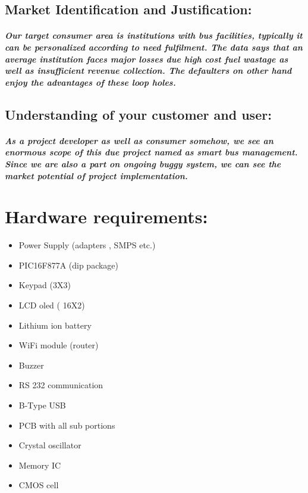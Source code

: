 \documentclass[]{article}
\begin{document}
\subsection{Market Identification and Justification:}
\subparagraph{Our target consumer area is institutions with bus facilities, typically it can be personalized according to need fulfilment. The data says that an average institution faces major losses due high cost fuel wastage as well as insufficient revenue collection. The defaulters on other hand enjoy the advantages of these loop holes.
}

\subsection{Understanding of your customer and user:}
\subparagraph{As a project developer as well as consumer somehow, we see an enormous scope of this due project named as smart bus management. Since we are also a part on ongoing buggy system, we can see the market potential of project implementation.}

\section{Hardware requirements:}
\begin{itemize}
	\item Power Supply (adapters , SMPS etc.)
	\item PIC16F877A (dip package)
	\item Keypad (3X3)
	\item LCD oled ( 16X2)
	\item Lithium ion battery
	\item WiFi module (router)
	\item Buzzer
	\item RS 232 communication
	\item B-Type USB
	\item PCB with all sub portions
	\item Crystal oscillator
	\item Memory IC 
	\item CMOS cell	
\end{itemize}
\end{document}
